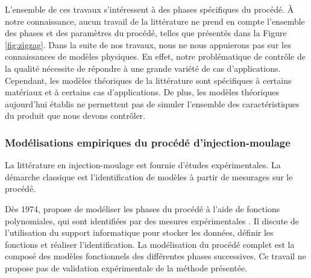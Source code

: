 L'ensemble de ces travaux s'intéressent à des phases spécifiques du procédé.
À notre connaissance, aucun travail de la littérature ne prend en compte l'ensemble des phases et des paramètres du procédé, telles que présentés dans la Figure \ref{fig:zigzag}.
Dans la suite de nos travaux, nous ne nous appuierons pas sur les connaissances de modèles physiques.
En effet, notre problématique de contrôle de la qualité nécessite de répondre à une grande variété de cas d'applications.
Cependant, les modèles théoriques de la littérature sont spécifiques à certains matériaux et à certains cas d'applications.
De plus, les modèles théoriques aujourd'hui établis ne permettent pas de simuler l'ensemble des caractéristiques du produit que nous devons contrôler.

\subsubsection{Modélisations empiriques du procédé d'injection-moulage}
La littérature en injection-moulage est fournie d'études expérimentales.
La démarche classique est l'identification de modèles à partir de mesurages sur le procédé.

Dès 1974, \citeauthor{ma_design_1974} propose de modéliser les phases du procédé à l'aide de fonctions polynomiales, qui sont identifiées par des mesures expérimentales \cite{ma_design_1974}.
Il discute de l'utilisation du support informatique pour stocker les données, définir les fonctions et réaliser l'identification.
La modélisation du procédé complet est la composé des modèles fonctionnels des différentes phases successives.
Ce travail ne propose pas de validation expérimentale de la méthode présentée.

